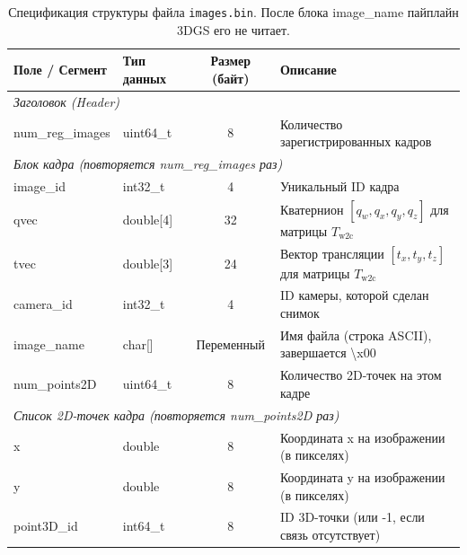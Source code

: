 \begin{table}[htbp]
	\centering
	\begin{tabularx}{\textwidth}{llcX}
		\toprule
		\textbf{Поле / Сегмент} & \textbf{Тип данных} & \textbf{Размер (байт)} & \textbf{Описание} \\
		\midrule
		\multicolumn{4}{l}{\textit{Заголовок (Header)}} \\
		\quad num\_reg\_images & uint64\_t & 8 & Количество зарегистрированных кадров \\
		\midrule
		\multicolumn{4}{l}{\textit{Блок кадра (повторяется num\_reg\_images раз)}} \\
		\quad image\_id & int32\_t & 4 & Уникальный ID кадра \\
		\quad qvec & double[4] & 32 & Кватернион $[q_w, q_x, q_y, q_z]$ для матрицы $T_\text{w2c}$ \\
		\quad tvec & double[3] & 24 & Вектор трансляции $[t_x, t_y, t_z]$ для матрицы $T_\text{w2c}$ \\
		\quad camera\_id & int32\_t & 4 & ID камеры, которой сделан снимок \\
		\quad image\_name & char[] & Переменный & Имя файла (строка ASCII), завершается \textbackslash x00 \\
		\quad num\_points2D & uint64\_t & 8 & Количество 2D-точек на этом кадре \\
		\midrule
		\multicolumn{4}{l}{\textit{Список 2D-точек кадра (повторяется num\_points2D раз)}} \\
		\quad x & double & 8 & Координата x на изображении (в пикселях) \\
		\quad y & double & 8 & Координата y на изображении (в пикселях) \\
		\quad point3D\_id & int64\_t & 8 & ID 3D-точки (или -1, если связь отсутствует) \\
		\bottomrule
	\end{tabularx}
	\caption{Спецификация структуры файла \texttt{images.bin}. После блока image\_name пайплайн 3DGS его не читает.}
	\label{tab:images_bin}
\end{table}

